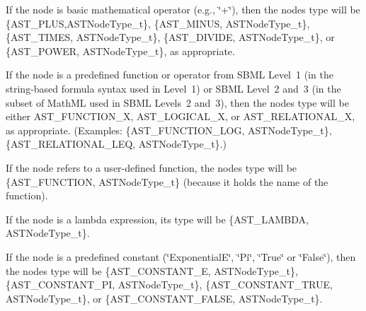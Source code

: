 \begin{DoxyItemize}
\item If the node is basic mathematical operator (e.\+g., {\ttfamily \char`\"{}+\char`\"{}}), then the node\textquotesingle{}s type will be \{A\+S\+T\+\_\+\+P\+L\+US,A\+S\+T\+Node\+Type\+\_\+t\}, \{A\+S\+T\+\_\+\+M\+I\+N\+US, A\+S\+T\+Node\+Type\+\_\+t\}, \{A\+S\+T\+\_\+\+T\+I\+M\+ES, A\+S\+T\+Node\+Type\+\_\+t\}, \{A\+S\+T\+\_\+\+D\+I\+V\+I\+DE, A\+S\+T\+Node\+Type\+\_\+t\}, or \{A\+S\+T\+\_\+\+P\+O\+W\+ER, A\+S\+T\+Node\+Type\+\_\+t\}, as appropriate.\end{DoxyItemize}
\begin{DoxyItemize}
\item If the node is a predefined function or operator from S\+B\+ML Level~1 (in the string-\/based formula syntax used in Level~1) or S\+B\+ML Level~2 and~3 (in the subset of Math\+ML used in S\+B\+ML Levels~2 and~3), then the node\textquotesingle{}s type will be either {\ttfamily A\+S\+T\+\_\+\+F\+U\+N\+C\+T\+I\+O\+N\+\_\+}X, {\ttfamily A\+S\+T\+\_\+\+L\+O\+G\+I\+C\+A\+L\+\_\+}X, or {\ttfamily A\+S\+T\+\_\+\+R\+E\+L\+A\+T\+I\+O\+N\+A\+L\+\_\+}X, as appropriate. (Examples\+: \{A\+S\+T\+\_\+\+F\+U\+N\+C\+T\+I\+O\+N\+\_\+\+L\+OG, A\+S\+T\+Node\+Type\+\_\+t\}, \{A\+S\+T\+\_\+\+R\+E\+L\+A\+T\+I\+O\+N\+A\+L\+\_\+\+L\+EQ, A\+S\+T\+Node\+Type\+\_\+t\}.)\end{DoxyItemize}
\begin{DoxyItemize}
\item If the node refers to a user-\/defined function, the node\textquotesingle{}s type will be \{A\+S\+T\+\_\+\+F\+U\+N\+C\+T\+I\+ON, A\+S\+T\+Node\+Type\+\_\+t\} (because it holds the name of the function).\end{DoxyItemize}
\begin{DoxyItemize}
\item If the node is a lambda expression, its type will be \{A\+S\+T\+\_\+\+L\+A\+M\+B\+DA, A\+S\+T\+Node\+Type\+\_\+t\}.\end{DoxyItemize}
\begin{DoxyItemize}
\item If the node is a predefined constant ({\ttfamily \char`\"{}\+Exponential\+E\char`\"{}}, {\ttfamily \char`\"{}\+Pi\char`\"{}}, {\ttfamily \char`\"{}\+True\char`\"{}} or {\ttfamily \char`\"{}\+False\char`\"{}}), then the node\textquotesingle{}s type will be \{A\+S\+T\+\_\+\+C\+O\+N\+S\+T\+A\+N\+T\+\_\+E, A\+S\+T\+Node\+Type\+\_\+t\}, \{A\+S\+T\+\_\+\+C\+O\+N\+S\+T\+A\+N\+T\+\_\+\+PI, A\+S\+T\+Node\+Type\+\_\+t\}, \{A\+S\+T\+\_\+\+C\+O\+N\+S\+T\+A\+N\+T\+\_\+\+T\+R\+UE, A\+S\+T\+Node\+Type\+\_\+t\}, or \{A\+S\+T\+\_\+\+C\+O\+N\+S\+T\+A\+N\+T\+\_\+\+F\+A\+L\+SE, A\+S\+T\+Node\+Type\+\_\+t\}.\end{DoxyItemize}
